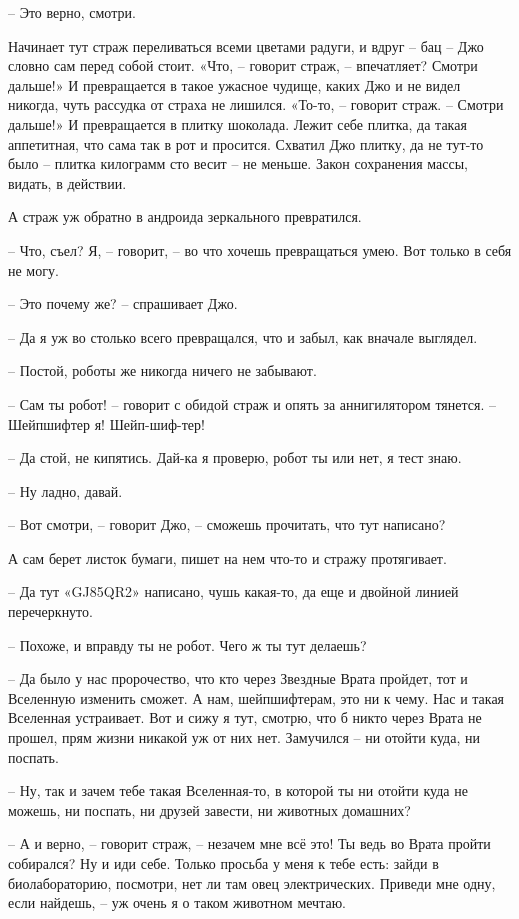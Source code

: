 \documentclass[ebook,oneside,final,openright]{memoir}
\begin{document}
– Это верно, смотри. \par
\par
Начинает тут страж переливаться всеми цветами радуги, и вдруг – бац – Джо словно сам перед собой стоит. «Что, – говорит страж, – впечатляет? Смотри дальше!» И превращается в такое ужасное чудище, каких Джо и не видел никогда, чуть рассудка от страха не лишился. «То-то, – говорит страж. – Смотри дальше!» И превращается в плитку шоколада. Лежит себе плитка, да такая аппетитная, что сама так в рот и просится. Схватил Джо плитку, да не тут-то было – плитка килограмм сто весит – не меньше. Закон сохранения массы, видать, в действии. \par
\par
А страж уж обратно в андроида зеркального превратился. \par
– Что, съел? Я, – говорит, – во что хочешь превращаться умею. Вот только в себя не могу. \par
– Это почему же? – спрашивает Джо.\par
– Да я уж во столько всего превращался, что и забыл, как вначале выглядел. \par
– Постой, роботы же никогда ничего не забывают. \par
– Сам ты робот! – говорит с обидой страж и опять за аннигилятором тянется. – Шейпшифтер я! Шейп-шиф-тер! \par
– Да стой, не кипятись. Дай-ка я проверю, робот ты или нет, я тест знаю. \par
– Ну ладно, давай. \par
– Вот смотри, – говорит Джо, – сможешь прочитать, что тут написано? \par
А сам берет листок бумаги, пишет на нем что-то и стражу протягивает. \par
– Да тут «GJ85QR2» написано, чушь какая-то, да еще и двойной линией перечеркнуто.\par
– Похоже, и вправду ты не робот. Чего ж ты тут делаешь? \par
– Да было у нас пророчество, что кто через Звездные Врата пройдет, тот и Вселенную изменить сможет. А нам, шейпшифтерам, это ни к чему. Нас и такая Вселенная устраивает. Вот и сижу я тут, смотрю, что б никто через Врата не прошел, прям жизни никакой уж от них нет. Замучился – ни отойти куда, ни поспать. \par
– Ну, так и зачем тебе такая Вселенная-то, в которой ты ни отойти куда не можешь, ни поспать, ни друзей завести, ни животных домашних? \par
– А и верно, – говорит страж, – незачем мне всё это! Ты ведь во Врата пройти собирался? Ну и иди себе. Только просьба у меня к тебе есть: зайди в биолабораторию, посмотри, нет ли там овец электрических. Приведи мне одну, если найдешь, – уж очень я о таком животном мечтаю.\par
\end{document}
